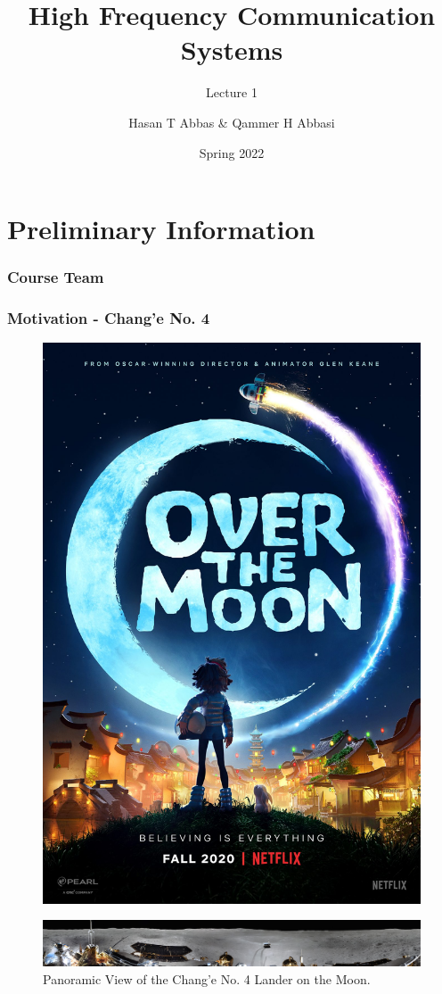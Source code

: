 \documentclass[10pt, compress]{beamer}
\title{High Frequency Communication Systems}
\subtitle{Lecture 1}
\date{Spring 2022}
\author{Hasan T Abbas \& Qammer H Abbasi}
\begin{document}
\maketitle

\section{Preliminary Information}

\begin{frame}
  \frametitle{Course Team}
  \begin{figure}[h!]
   \hfil
\end{figure}
\end{frame}
\begin{frame}
  \frametitle{Motivation - Chang'e No. 4}
    \begin{figure}
  \centering
  \includegraphics[width=.35\linewidth]{overthemoon.jpeg}
\end{figure}
  \begin{figure}
  \centering
  \includegraphics[width=.85\linewidth]{change.jpg}
  \caption*{Panoramic View of the Chang'e No. 4 Lander on the Moon.}
\end{figure}
\end{frame}
\end{document}
